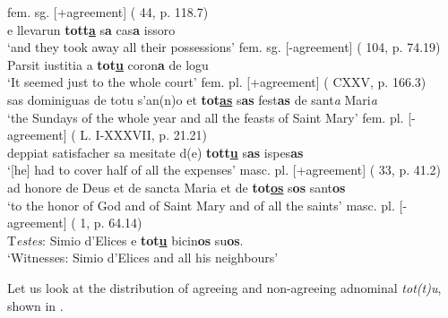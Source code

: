 \documentclass[output=paper,colorlinks,citecolor=brown]{langscibook}
\begin{document}
\ea\label{ex:men28}
\ea fem. sg. [+agreement] ( 44, p. 118.7)\\
e llevarun \textbf{tott\ul{a}} s\textbf{a} cas\textbf{a} issoro\\
‘and they took away all their possessions’
\ex fem. sg. [-agreement] ( 104, p. 74.19)\\
Parsit iustitia a \textbf{tot\ul{u}} coron\textbf{a} de logu\\
‘It seemed just to the whole court’
\z
\ex\label{ex:men29} 
\ea fem. pl. [+agreement] ( CXXV, p. 166.3)\\
sas dominiguas de totu s'an(n)o et \textbf{tot\ul{as}} s\textbf{as} fest\textbf{as} de sant\textit{a} Mari\textit{a}\\
‘the Sundays of the whole year and all the feasts of Saint Mary’
\ex fem. pl. [-agreement] ( L. I-XXXVII, p. 21.21)\\
deppiat satisfacher sa mesitate d(e) \textbf{tott\ul{u}} s\textbf{as} ispes\textbf{as}\\
‘[he] had to cover half of all the expenses'
\z
\ex\label{ex:men30} 
\ea masc. pl. [+agreement] ( 33, p. 41.2)\\
ad honore de Deus et de sancta Maria et de \textbf{tot\ul{os}} s\textbf{os} sant\textbf{os}\\
‘to the honor of God and of Saint Mary and of all the saints’ 
\ex masc. pl. [-agreement] ( 1, p. 64.14)\\
T\textit{estes}: Simio d'Elices e \textbf{tot\ul{u}} bicin\textbf{os} su\textbf{os}.\\
‘Witnesses: Simio d’Elices and all his neighbours’
\z
\z

Let us look at the distribution of agreeing and non-agreeing adnominal \textit{tot(t)u}, shown in .
\end{document}
